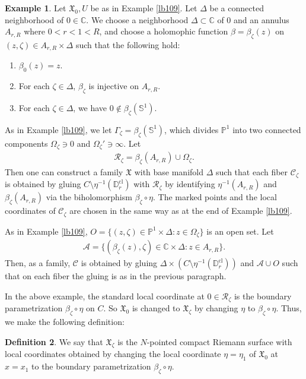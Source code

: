 \documentclass[12pt,a4paper,notitlepage]{article}
\theoremstyle{definition}
\newtheorem{df}{Definition}[section]
\newtheorem{eg}[df]{Example}
\theoremstyle{plain}
\newcommand{\fk}{\mathfrak}
\newcommand{\mc}{\mathcal}
\newcommand{\Cbb}{\mathbb C}
\newcommand{\Pbb}{\mathbb P}
\newcommand{\Dbb}{\mathbb D}
\newcommand{\Sbb}{{\mathbb S}}
\newcommand{\cl}{\mathrm{cl}}
\numberwithin{equation}{section}
\begin{document}
\begin{eg}\label{lb111}
Let $\fk X_0,U$ be as in Example \ref{lb109}. Let $\Delta$ be a connected neighborhood of $0\in\Cbb$. We choose a neighborhood $\Delta\subset\Cbb$ of $0$ and an annulus $A_{r,R}$ where $0<r<1<R$, and choose a holomophic function $\beta=\beta_\zeta(z)$ on $(z,\zeta)\in A_{r,R}\times\Delta$ such that the following hold:
\begin{enumerate}
\item $\beta_0(z)=z$.
\item For each $\zeta\in\Delta$, $\beta_\zeta$ is injective on $A_{r,R}$.
\item For each $\zeta\in\Delta$, we have $0\notin\beta_\zeta(\Sbb^1)$.
\end{enumerate}

As in Example \ref{lb109}, we let $\Gamma_\zeta=\beta_\zeta(\Sbb^1)$, which divides $\Pbb^1$ into two connected components $\Omega_\zeta\ni 0$ and $\Omega_\zeta'\ni\infty$. Let
\begin{align*}
\mc R_\zeta=\beta_\zeta(A_{r,R})\cup\Omega_\zeta.
\end{align*}
Then one can construct a family $\fk X$ with base manifold $\Delta$ such that each fiber $\mc C_\zeta$ is obtained by gluing $C\setminus\eta^{-1}(\Dbb_r^\cl)$ with $\mc R_\zeta$ by identifying $\eta^{-1}(A_{r,R})$ and $\beta_\zeta(A_{r,R})$ via the biholomorphism $\beta_\zeta\circ\eta$. The marked points and the local coordinates of $\mc C_\zeta$ are chosen in the same way as at the end of Example \ref{lb109}. 

As in Example \ref{lb109}, $O=\{(z,\zeta)\in\Pbb^1\times\Delta:z\in\Omega_\zeta\}$ is an open set. Let
\begin{align*}
\mc A=\{(\beta_\zeta(z),\zeta)\in \Cbb\times\Delta:z\in A_{r,R}\}.
\end{align*}
Then, as a family, $\mc C$ is obtained by gluing $\Delta\times(C\setminus\eta^{-1}(\Dbb_r^\cl))$ and $\mc A\cup O$ such that on each fiber the gluing is as in the previous paragraph. \hfill\qedsymbol
\end{eg}

In the above example, the standard local coordinate at $0\in\mc R_\zeta$ is the boundary parametrization $\beta_\zeta\circ\eta$ on $C$. So $\fk X_0$ is changed to $\fk X_\zeta$ by changing $\eta$ to $\beta_\zeta\circ\eta$. Thus, we make the following definition:
\begin{df}\label{lb115}
We say that $\fk X_\zeta$ is the $N$-pointed compact Riemann surface with local coordinates obtained by changing the local coordinate $\eta=\eta_1$ of $\fk X_0$ at $x=x_1$ to the boundary parametrization $\beta_\zeta\circ\eta$.
\end{df}
\end{document}
